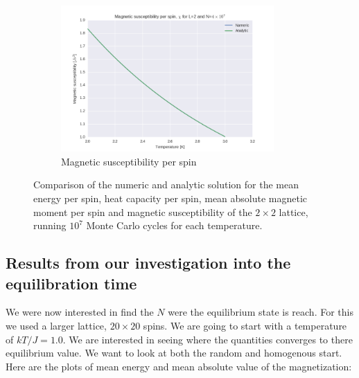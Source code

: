 \documentclass[a4paper, 10pt]{article}
\begin{document}
\begin{figure}[!ht]
\begin{subfigure}[H!]{0.5\textwidth}
        \centering
        \includegraphics[height=2.2in]{L2MagSus4e7.png}
        \caption{Magnetic susceptibility per spin}
    \end{subfigure}
    \caption{Comparison of the numeric and  analytic solution for the mean energy per spin, heat capacity per spin, mean absolute magnetic moment per spin and magnetic susceptibility of the $2 \times 2$ lattice, running $10^7$ Monte Carlo cycles for each temperature. }\label{fig:2x2_thermo}
\end{figure}
\subsection{Results from our investigation into the equilibration time}
We were now interested in find the $N$ were the equilibrium state is reach. For this we used a larger lattice, $20 \times 20$ spins. We are going to start with a temperature of $kT/J=1.0$. We are interested in seeing where the quantities converges to there equilibrium value. We want to look at both the random and homogenous start. Here are the plots of mean energy and mean absolute value of the magnetization: 
\end{document}
